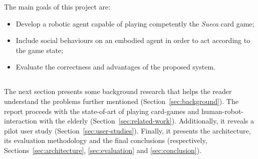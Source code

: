 The main goals of this project are:
\begin{itemize}
\item Develop a robotic agent capable of playing competently the \emph{Sueca} card game;
\item Include social behaviours on an embodied agent in order to act according to the game state;
\item Evaluate the correctness and advantages of the proposed system.
\end{itemize}

\subsection*{\centering*}

The next section presents some background research that helps the reader understand the problems further mentioned (Section~\ref{sec:background}).
The report proceeds with the state-of-art of playing card-games and human-robot-interaction with the elderly (Section~\ref{sec:related-work}).
Additionally, it reveals a pilot user study (Section~\ref{sec:user-studies}).
Finally, it presents the architecture, its evaluation methodology and the final conclusions (respectively, Sections~\ref{sec:architecture}, \ref{sec:evaluation} and \ref{sec:conclusion}).


